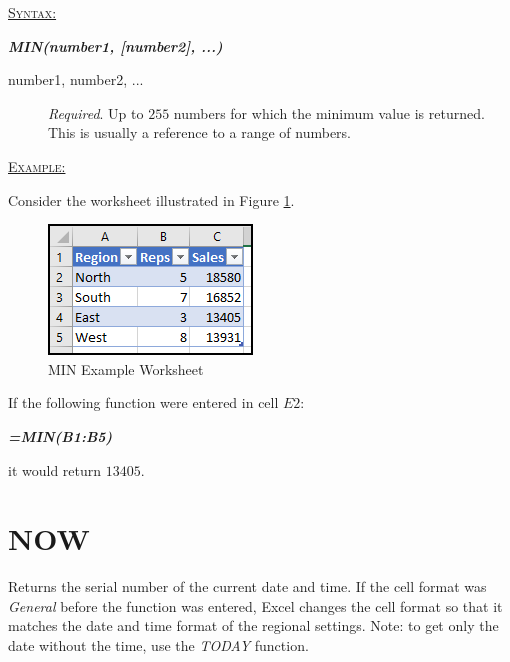 \begin{addmargin}[1cm]{0cm}
	
	\medskip
	\underline{\textsc{Syntax:}}
	\medskip
	
	{\color{Syntax}
		\noindent\textbf{\textit{MIN(number1, [number2], ...)}}
	}
	
	\begin{description}
		\item[number1, number2, ...] \textit{Required}. Up to $ 255 $ numbers for which the minimum value is returned.  This is usually a reference to a range of numbers.
	\end{description}

	\medskip
	\noindent\underline{\textsc{Example:}}
	\medskip
	
	\noindent Consider the worksheet illustrated in Figure \ref{apa:min}.
	
	\begin{figure}[H]
		\centering
		\includegraphics[width=\maxwidth{.45\linewidth}]{gfx/apa_fig01}
		\caption{MIN Example Worksheet}
		\label{apa:min}
	\end{figure}
	
	\noindent If the following function were entered in cell $ E2 $:
	
	{\color{Syntax}
		\textit{\textbf{=MIN(B1:B5)}}
	}
	
	\noindent it would return $ 13405 $.

\end{addmargin}

\section{NOW}

Returns the serial number of the current date and time. If the cell format was \textit{General} before the function was entered, Excel changes the cell format so that it matches the date and time format of the regional settings. Note: to get only the date without the time, use the \textit{TODAY} function.


